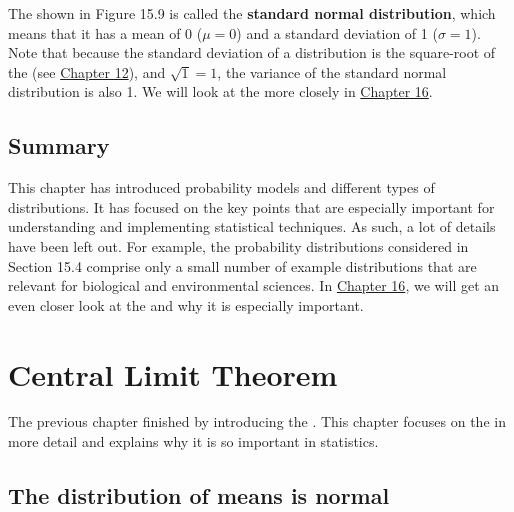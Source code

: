\documentclass[
  openany]{krantz}
\begin{document}
The  shown in Figure 15.9 is called the \textbf{standard normal distribution}, which means that it has a mean of 0 (\(\mu = 0\)) and a standard deviation of 1 (\(\sigma = 1\)).
Note that because the standard deviation of a distribution is the square-root of the  (see \protect\hyperlink{Chapter_12}{Chapter 12}), and \(\sqrt{1} = 1\), the variance of the standard normal distribution is also 1.
We will look at the  more closely in \protect\hyperlink{Chapter_16}{Chapter 16}.

\hypertarget{summary-2}{%
\section{Summary}\label{summary-2}}

This chapter has introduced probability models and different types of distributions.
It has focused on the key points that are especially important for understanding and implementing statistical techniques.
As such, a lot of details have been left out.
For example, the probability distributions considered in Section 15.4 comprise only a small number of example distributions that are relevant for biological and environmental sciences.
In \protect\hyperlink{Chapter_16}{Chapter 16}, we will get an even closer look at the  and why it is especially important.

\hypertarget{Chapter_16}{%
\chapter{Central Limit Theorem}\label{Chapter_16}}

The previous chapter finished by introducing the .
This chapter focuses on the  in more detail and explains why it is so important in statistics.

\hypertarget{the-distribution-of-means-is-normal}{%
\section{The distribution of means is normal}\label{the-distribution-of-means-is-normal}}
\end{document}
